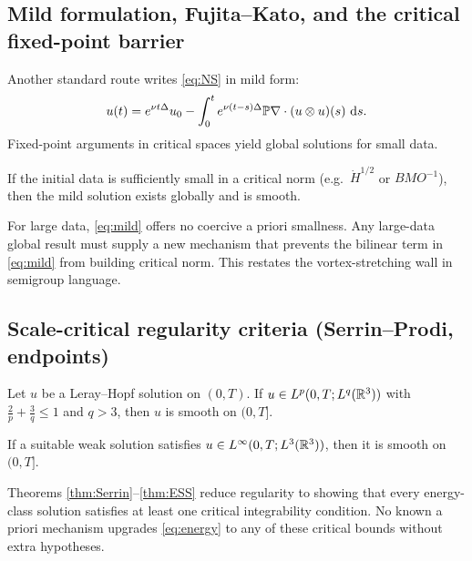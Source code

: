 \subsection{Mild formulation, Fujita--Kato, and the critical fixed-point barrier}
Another standard route writes \eqref{eq:NS} in mild form:
\begin{equation}\label{eq:mild}
u(t)=e^{\nu t\Delta}u_0 - \int_0^t e^{\nu(t-s)\Delta}\mathbb{P}\nabla\cdot (u\otimes u)(s)\,\,\mathrm{d} s.
\end{equation}
Fixed-point arguments in critical spaces yield global solutions for small data.

\begin{theorem}
If the initial data is sufficiently small in a critical norm (e.g.\ $\dot H^{1/2}$ or $BMO^{-1}$),
then the mild solution exists globally and is smooth.
\end{theorem}

\begin{proposition}\label{prop:fixedpoint-wall}
For large data, \eqref{eq:mild} offers no coercive a priori smallness.
Any large-data global result must supply a new mechanism that prevents the bilinear term in
\eqref{eq:mild} from building critical norm.
This restates the vortex-stretching wall in semigroup language.
\end{proposition}

\subsection{Scale-critical regularity criteria (Serrin--Prodi, endpoints)}
\begin{theorem}\label{thm:Serrin}
Let $u$ be a Leray--Hopf solution on $(0,T)$. If
$u\in L^p(0,T;L^q(\mathbb{R}^3))$ with $\frac{2}{p}+\frac{3}{q}\le 1$ and $q>3$,
then $u$ is smooth on $(0,T]$.
\end{theorem}

\begin{theorem}\label{thm:ESS}
If a suitable weak solution satisfies $u\in L^\infty(0,T;L^3(\mathbb{R}^3))$, then it is smooth on $(0,T]$.
\end{theorem}

\begin{proposition}\label{prop:serrin-wall}
Theorems \ref{thm:Serrin}--\ref{thm:ESS} reduce regularity to showing that every energy-class solution
satisfies at least one critical integrability condition. No known a priori mechanism upgrades
\eqref{eq:energy} to any of these critical bounds without extra hypotheses.
\end{proposition}

